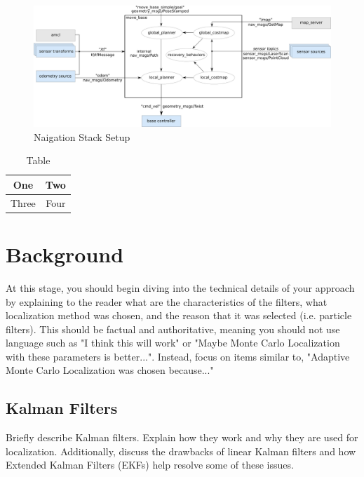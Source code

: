 \documentclass[10pt,journal,compsoc]{IEEEtran}
\begin{document}
    \begin{figure}[thpb]
          \centering
          \includegraphics[width=\linewidth]{overview_tf.png}
          \caption{Naigation Stack Setup}
          \label{fig:robot1}
    \end{figure}

    \begin{table}[h]
    \caption{Table}
    \label{table_example}
    \begin{center}
    \begin{tabular}{|c||c|}
    \hline
    One & Two\\
    \hline
    Three & Four\\
    \hline
    \end{tabular}
    \end{center}
    \end{table}
    
    
    
    \section{Background}
    At this stage, you should begin diving into the technical details of your approach by explaining to the reader what are the characteristics of the filters, what localization method was chosen, and the reason that it was selected (i.e. particle filters). 
    This should be factual and authoritative, meaning you should not use language such as "I think this will work" or "Maybe Monte Carlo Localization with these parameters is better...". Instead, focus on items similar to, "Adaptive Monte Carlo Localization was chosen because..."

    \subsection{Kalman Filters}
    Briefly describe Kalman filters. Explain how they work and why they are used for localization. Additionally, discuss the drawbacks of linear Kalman filters and how Extended Kalman Filters (EKFs) help resolve some of these issues.
    
\end{document}
